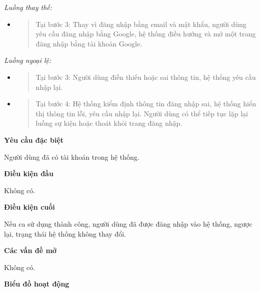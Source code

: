 \documentclass[./../main.tex]{subfiles}
\begin{document}
\emph{Luồng thay thế:}

\begin{itemize}
\item
  \begin{quote}
  Tại bước 3: Thay vì đăng nhập bằng email và mật khẩu, người dùng yêu
  cầu đăng nhập bằng Google, hệ thống điều hướng và mở một trang đăng
  nhập bằng tài khoản Google.
  \end{quote}
\end{itemize}

\emph{Luồng ngoại lệ:}

\begin{itemize}
\item
  \begin{quote}
  Tại bước 3: Người dùng điền thiếu hoặc sai thông tin, hệ thống yêu cầu
  nhập lại.
  \end{quote}
\item
  \begin{quote}
  Tại bước 4: Hệ thống kiểm định thông tin đăng nhập sai, hệ thống hiển
  thị thông tin lỗi, yêu cầu nhập lại. Người dùng có thể tiếp tục lặp
  lại luồng sự kiện hoặc thoát khỏi trang đăng nhập.
  \end{quote}
\end{itemize}

\textbf{Yêu cầu đặc biệt}

Người dùng đã có tài khoản trong hệ thống.

\textbf{Điều kiện đầu}

Không có.

\textbf{Điều kiện cuối}

Nếu ca sử dụng thành công, người dùng đã được đăng nhập vào hệ thống,
ngược lại, trạng thái hệ thống không thay đổi.

\textbf{Các vấn đề mở}

Không có.

\textbf{Biểu đồ hoạt động}
\end{document}
